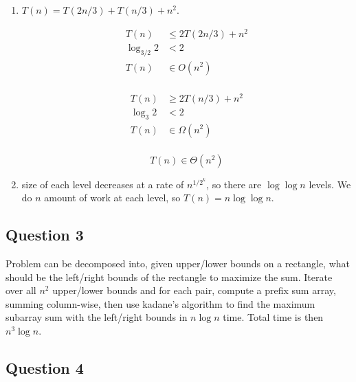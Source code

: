 \documentclass[11pt]{article}
\begin{document}
\begin{enumerate}
    \item $T(n) = T(2n/3) + T(n/3) + n^2$.

          \begin{align*}
              T(n)         & \leq 2 T(2n/3) + n^2 \\
              \log_{3/2} 2 & < 2                  \\
              T(n)         & \in O(n^2)           \\
          \end{align*}

          \begin{align*}
              T(n)     & \geq 2 T(n/3) + n^2 \\
              \log_3 2 & < 2                 \\
              T(n)     & \in \Omega(n^2)     \\
          \end{align*}

          \[T(n) \in \Theta(n^2)\]

    \item size of each level decreases at a rate of $n^{1/2^k}$, so there are $\log \log n$ levels. We do $n$ amount of work at each level, so $T(n) = n \log \log n$.

\end{enumerate}

\subsection{Question 3}

Problem can be decomposed into, given upper/lower bounds on a rectangle, what should be the left/right bounds of the rectangle to maximize the sum. Iterate over all $n^2$ upper/lower bounds and for each pair, compute a prefix sum array, summing column-wise, then use kadane's algorithm to find the maximum subarray sum with the left/right bounds in $n \log n$ time. Total time is then $n^3 \log n$.

\subsection{Question 4}
\end{document}

